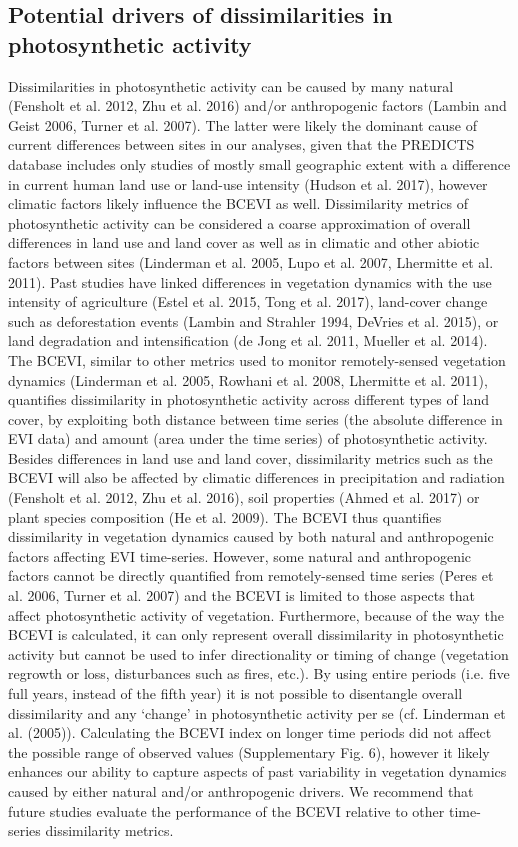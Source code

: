 {\subsection{Potential drivers of dissimilarities in photosynthetic activity}
Dissimilarities in photosynthetic activity can be caused by many natural (Fensholt et al. 2012, Zhu et al. 2016) and/or anthropogenic factors (Lambin and Geist 2006, Turner et al. 2007). The latter were likely the dominant cause of current differences between sites in our analyses, given that the PREDICTS database includes only studies of mostly small geographic extent with a difference in current human land use or land-use intensity (Hudson et al. 2017), however climatic factors likely influence the BCEVI as well. Dissimilarity metrics of photosynthetic activity can be considered a coarse approximation of overall differences in land use and land cover as well as in climatic and other abiotic factors between sites (Linderman et al. 2005, Lupo et al. 2007, Lhermitte et al. 2011). Past studies have linked differences in vegetation dynamics with the use intensity of agriculture (Estel et al. 2015, Tong et al. 2017), land-cover change such as deforestation events (Lambin and Strahler 1994, DeVries et al. 2015), or land degradation and intensification (de Jong et al. 2011, Mueller et al. 2014). The BCEVI, similar to other metrics used to monitor remotely-sensed vegetation dynamics (Linderman et al. 2005, Rowhani et al. 2008, Lhermitte et al. 2011), quantifies dissimilarity in photosynthetic activity across different types of land cover, by exploiting both distance between time series (the absolute difference in EVI data) and amount (area under the time series) of photosynthetic activity. Besides differences in land use and land cover, dissimilarity metrics such as the BCEVI will also be affected by climatic differences in precipitation and radiation (Fensholt et al. 2012, Zhu et al. 2016), soil properties (Ahmed et al. 2017) or plant species composition (He et al. 2009). The BCEVI thus quantifies dissimilarity in vegetation dynamics caused by both natural and anthropogenic factors affecting EVI time-series.
	However, some natural and anthropogenic factors cannot be directly quantified from remotely-sensed time series (Peres et al. 2006, Turner et al. 2007) and the BCEVI is limited to those aspects that affect photosynthetic activity of vegetation. Furthermore, because of the way the BCEVI is calculated, it can only represent overall dissimilarity in photosynthetic activity but cannot be used to infer directionality or timing of change (vegetation regrowth or loss, disturbances such as fires, etc.). By using entire periods (i.e. five full years, instead of the fifth year) it is not possible to disentangle overall dissimilarity and any ‘change’ in photosynthetic activity per se (cf. Linderman et al. (2005)). Calculating the BCEVI index on longer time periods did not affect the possible range of observed values (Supplementary Fig. 6), however it likely enhances our ability to capture aspects of past variability in vegetation dynamics caused by either natural and/or anthropogenic drivers. We recommend that future studies evaluate the performance of the BCEVI relative to other time-series dissimilarity metrics. 

}
